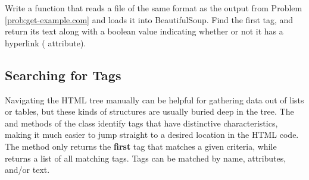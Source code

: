 \begin{problem} %
Write a function that reads a file of the same format as the output from Problem \ref{prob:get-example.com} and loads it into BeautifulSoup.
Find the first  tag, and return its text along with a boolean value indicating whether or not it has a hyperlink ( attribute).
\end{problem}

\begin{comment}
\begin{problem} %

Write a function that returns the following line using three different methods.
\begin{lstlisting}
<<'More information...'>>
\end{lstlisting}
The function should accept an integer.
If the integer is 1, find the line using tag names and the \li{.string} method.
If the integer is 2, find the line by traversing through the children of the body tag with repeated calls to \li{.contents}.
If the integer is 3, find the line by using navigation between siblings and \li{.string}.
\end{problem}
\end{comment}

\subsection*{Searching for Tags} %

Navigating the HTML tree manually can be helpful for gathering data out of lists or tables, but these kinds of structures are usually buried deep in the tree.
The  and  methods of the  class identify tags that have distinctive characteristics, making it much easier to jump straight to a desired location in the HTML code.
The  method only returns the \textbf{first} tag that matches a given criteria, while  returns a list of all matching tags.
Tags can be matched by name, attributes, and/or text.

